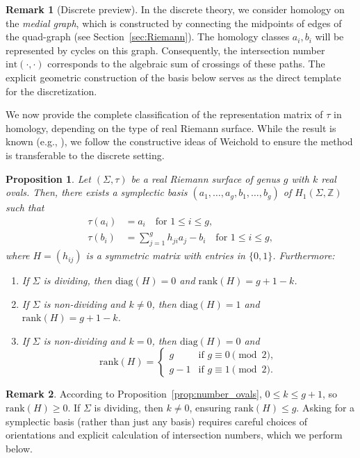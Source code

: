 \documentclass[11pt,a4paper]{article}
\newtheorem{proposition}[theorem]{Proposition}
\theoremstyle{definition}
\newtheorem*{remark}{Remark}
\newcommand{\Z}{\mathds{Z}}
\begin{document}
\begin{remark}[Discrete preview]
	In the discrete theory, we consider homology on the \emph{medial graph}, which is constructed by connecting the midpoints of edges of the quad-graph (see Section~\ref{sec:Riemann}). The homology classes $a_i, b_i$ will be represented by cycles on this graph. Consequently, the intersection number $\mathrm{int}(\cdot, \cdot)$ corresponds to the algebraic sum of crossings of these paths. The explicit geometric construction of the basis below serves as the direct template for the discretization.
\end{remark}

We now provide the complete classification of the representation matrix of $\tau$ in homology, depending on the type of real Riemann surface. While the result is known (e.g., \cite{Vin93}), we follow the constructive ideas of Weichold \cite{Wei83} to ensure the method is transferable to the discrete setting.

\begin{proposition}\label{prop:realhomology}
	Let $(\Sigma,\tau)$ be a real Riemann surface of genus $g$ with $k$ real ovals. Then, there exists a symplectic basis $(a_1, \ldots, a_g, b_1, \ldots, b_g)$ of $H_1(\Sigma,\Z)$ such that
	\begin{align*}
		\tau(a_i) &= a_i \quad \text{for } 1 \leq i \leq g,\\
		\tau(b_i) &= \sum_{j=1}^g h_{ji} a_j - b_i \quad \text{for } 1 \leq i \leq g,
	\end{align*}
	where $H = (h_{ij})$ is a symmetric matrix with entries in $\{0,1\}$. Furthermore:
	\begin{enumerate}
		\item[(i)] If $\Sigma$ is dividing, then $\mathrm{diag}(H) = 0$ and $\mathrm{rank}(H) = g + 1 - k$.
		\item[(ii)] If $\Sigma$ is non-dividing and $k \neq 0$, then $\mathrm{diag}(H) = 1$ and $\mathrm{rank}(H) = g + 1 - k$.
		\item[(iii)] If $\Sigma$ is non-dividing and $k = 0$, then $\mathrm{diag}(H) = 0$ and
		\[
		\mathrm{rank}(H) =
		\begin{cases}
			g & \text{if } g \equiv 0 \pmod 2, \\
			g - 1 & \text{if } g \equiv 1 \pmod 2.
		\end{cases}
		\]
	\end{enumerate}
\end{proposition}

\begin{remark}
	According to Proposition~\ref{prop:number_ovals}, $0 \leq k \leq g+1$, so $\mathrm{rank}(H)\geq 0$. If $\Sigma$ is dividing, then $k \neq 0$, ensuring $\mathrm{rank}(H)\leq g$.
	Asking for a symplectic basis (rather than just any basis) requires careful choices of orientations and explicit calculation of intersection numbers, which we perform below.
\end{remark}
\end{document}
